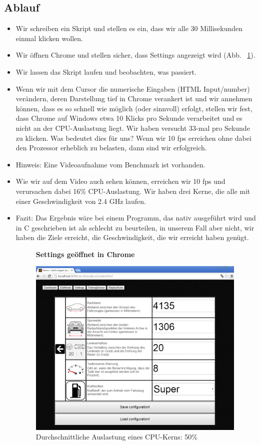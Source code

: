 \documentclass[qualitaetssicherung.tex]{subfiles}
\begin{document}
	\subsection{Ablauf}
	\begin{itemize}
	\item Wir schreiben ein Skript und stellen es ein, dass wir alle 30 Millisekunden einmal klicken wollen.
	\item Wir öffnen Chrome und stellen sicher, dass Settings angezeigt wird (Abb. ~\ref{settings_speedtest}).
	\item Wir lassen das Skript laufen und beobachten, was passiert.
	\item Wenn wir mit dem Cursor die numerische Eingaben (HTML Input/number) verändern, deren Darstellung tief in Chrome verankert ist und wir annehmen können, dass es so schnell wie möglich (oder sinnvoll) erfolgt, stellen wir fest, dass Chrome auf Windows etwa 10 Klicks pro Sekunde verarbeitet und es nicht an der CPU-Auslastung liegt. Wir haben versucht 33-mal pro Sekunde zu klicken. Was bedeutet dies für uns? Wenn wir 10 fps erreichen ohne dabei den Prozessor erheblich zu belasten, dann sind wir erfolgreich.
	\item Hinweis: Eine Videoaufnahme vom Benchmark ist vorhanden.
	\item Wie wir auf dem Video auch sehen können, erreichen wir 10 fps und verursachen dabei 16\% CPU-Auslastung. Wir haben drei Kerne, die alle mit einer Geschwindigkeit von 2.4 GHz laufen.
	\item Fazit: Das Ergebnis wäre bei einem Programm, das nativ ausgeführt wird und in C geschrieben ist als schlecht zu beurteilen, in unserem Fall aber nicht, wir haben die Ziele erreicht, die Geschwindigkeit, die wir erreicht haben genügt.
	
	\begin{figure}[H]
    \textbf{Settings geöffnet in Chrome}\par\medskip
    \includegraphics[width=0.99\textwidth]{Images/settings-speedtest.png}
    \caption{Durchschnittliche Auslastung eines CPU-Kerns: 50\%}
		\label{settings_speedtest}
	\end{figure}
	\end{itemize}
	
\end{document}
